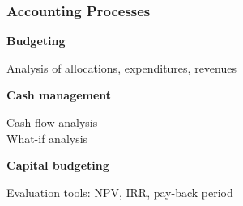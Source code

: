 \subsubsection{Accounting Processes}
\begin{adjustwidth}{2cm}{}

    \textbf{Budgeting}
        \begin{adjustwidth}{1cm}{}
            Analysis of allocations, expenditures, revenues\\
        \end{adjustwidth}
    \textbf{Cash management}
        \begin{adjustwidth}{1cm}{}
            Cash flow analysis\\
            What-if analysis\\
        \end{adjustwidth}
    \textbf{Capital budgeting}
        \begin{adjustwidth}{1cm}{}
            Evaluation tools: NPV, IRR, pay-back period\\
        \end{adjustwidth}

\end{adjustwidth}

